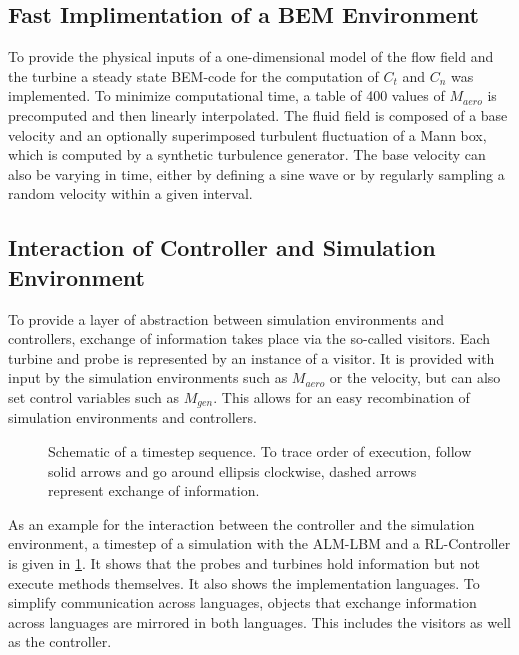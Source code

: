 \subsection{Fast Implimentation of a BEM Environment}
To provide the physical inputs of a one-dimensional model of the flow field and the turbine a steady state BEM-code for the computation of $C_t$ and $C_n$ was implemented. To minimize computational time, a table of 400 values of $M_{aero}$ is precomputed and then linearly interpolated. The fluid field is composed of a base velocity and an optionally superimposed turbulent fluctuation of a Mann box, which is computed by a synthetic turbulence generator. The base velocity can also be varying in time, either by defining a sine wave or by regularly sampling a random velocity within a given interval.
\subsection{Interaction of Controller and Simulation Environment}
To provide a layer of abstraction between simulation environments and controllers, exchange of information takes place via the so-called visitors. Each turbine and probe is represented by an instance of a visitor. It is provided with input by the simulation environments such as $M_{aero}$ or the velocity, but can also set control variables such as $M_{gen}$. This allows for an easy recombination of simulation environments and controllers. \\
\begin{figure}[h]
	\centering
	\def\svgwidth{1 \textwidth}
	
	\caption{Schematic of a timestep sequence. To trace order of execution, follow solid arrows and go around ellipsis clockwise, dashed arrows represent exchange of information.}
	\label{fig:timestep}
\end{figure}
As an example for the interaction between the controller and the simulation environment, a timestep of a simulation with the ALM-LBM and a RL-Controller is given in \ref{fig:timestep}. It shows that the probes and turbines hold information but not execute methods themselves. It also shows the implementation languages. To simplify communication across languages, objects that exchange information across languages are mirrored in both languages. This includes the visitors as well as the controller.
